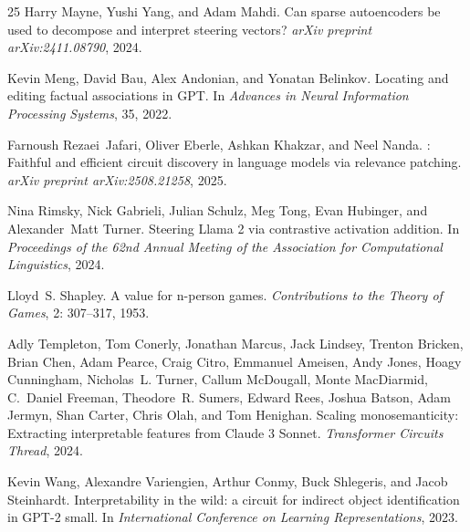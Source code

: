 \documentclass[11pt]{article}
\begin{document}
\begin{thebibliography}{25}
Harry Mayne, Yushi Yang, and Adam Mahdi.
\newblock Can sparse autoencoders be used to decompose and interpret steering
  vectors?
\newblock \emph{arXiv preprint arXiv:2411.08790}, 2024.

Kevin Meng, David Bau, Alex Andonian, and Yonatan Belinkov.
\newblock Locating and editing factual associations in {GPT}.
\newblock In \emph{Advances in Neural Information Processing Systems}, 35, 2022.

Farnoush Rezaei~Jafari, Oliver Eberle, Ashkan Khakzar, and Neel Nanda.
: Faithful and efficient circuit discovery in language models
  via relevance patching.
\newblock \emph{arXiv preprint arXiv:2508.21258}, 2025.

Nina Rimsky, Nick Gabrieli, Julian Schulz, Meg Tong, Evan Hubinger, and
  Alexander~Matt Turner.
\newblock Steering {Llama} 2 via contrastive activation addition.
\newblock In \emph{Proceedings of the 62nd Annual Meeting of the Association
  for Computational Linguistics}, 2024.

Lloyd~S. Shapley.
\newblock A value for n-person games.
\newblock \emph{Contributions to the Theory of Games}, 2: 307--317,
  1953.

Adly Templeton, Tom Conerly, Jonathan Marcus, Jack Lindsey, Trenton Bricken,
  Brian Chen, Adam Pearce, Craig Citro, Emmanuel Ameisen, Andy Jones, Hoagy
  Cunningham, Nicholas~L. Turner, Callum McDougall, Monte MacDiarmid, C.~Daniel
  Freeman, Theodore~R. Sumers, Edward Rees, Joshua Batson, Adam Jermyn, Shan
  Carter, Chris Olah, and Tom Henighan.
\newblock Scaling monosemanticity: Extracting interpretable features from
  {Claude} 3 {Sonnet}.
\newblock \emph{Transformer Circuits Thread}, 2024.

Kevin Wang, Alexandre Variengien, Arthur Conmy, Buck Shlegeris, and Jacob
  Steinhardt.
\newblock Interpretability in the wild: a circuit for indirect object
  identification in {GPT}-2 small.
\newblock In \emph{International Conference on Learning Representations}, 2023.


\end{thebibliography}
\end{document}
